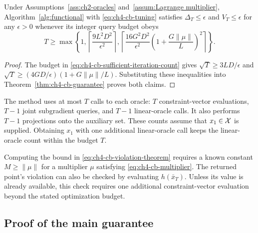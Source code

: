 \begin{Thm:Corollary}\label{cor:ch4-cb-iteration-complexity}
Under Assumptions~\ref{ass:ch2-oracles} and~\ref{assum:Lagrange multiplier},
Algorithm~\ref{alg:functional} with \eqref{eq:ch4-cb-tuning} satisfies
$\Delta_T\le\epsilon$ and $V_T\le\epsilon$ for any $\epsilon>0$
whenever its integer query budget obeys
\begin{equation}\label{eq:ch4-cb-sufficient-iteration-count}
T\ge\max\left\{1,
\left\lceil\frac{9L^2D^2}{\epsilon^2}\right\rceil,
\left\lceil\frac{16G^2D^2}{\epsilon^2}
\left(1+\frac{G\|\mu\|}{L}\right)^2\right\rceil\right\}.
\end{equation}
\end{Thm:Corollary}
\begin{proof}
The budget in \eqref{eq:ch4-cb-sufficient-iteration-count} gives
$\sqrt T\ge3LD/\epsilon$ and
$\sqrt T\ge(4GD/\epsilon)(1+G\|\mu\|/L)$.
Substituting these inequalities into
Theorem~\ref{thm:ch4-cb-guarantee} proves both claims.
\end{proof}

The method uses at most $T$ calls to each oracle: $T$ constraint-vector
evaluations, $T-1$ joint subgradient queries, and $T-1$ linear-oracle calls.
It also performs $T-1$ projections onto the auxiliary set.
These counts assume that $x_1\in\mathcal{X}$ is supplied. Obtaining $x_1$ with one
additional linear-oracle call keeps the linear-oracle count within the
budget $T$.

Computing the bound in
\eqref{eq:ch4-cb-violation-theorem} requires a known constant
$M\ge\|\mu\|$ for a multiplier $\mu$ satisfying
\eqref{eq:ch4-cb-multiplier}. The returned point's violation can also be
checked by evaluating $h(\bar x_T)$. Unless its value is already
available, this check requires one additional constraint-vector
evaluation beyond the stated optimization budget.

\subsection{Proof of the main guarantee}
\label{sec:ch4-cb-proof}

